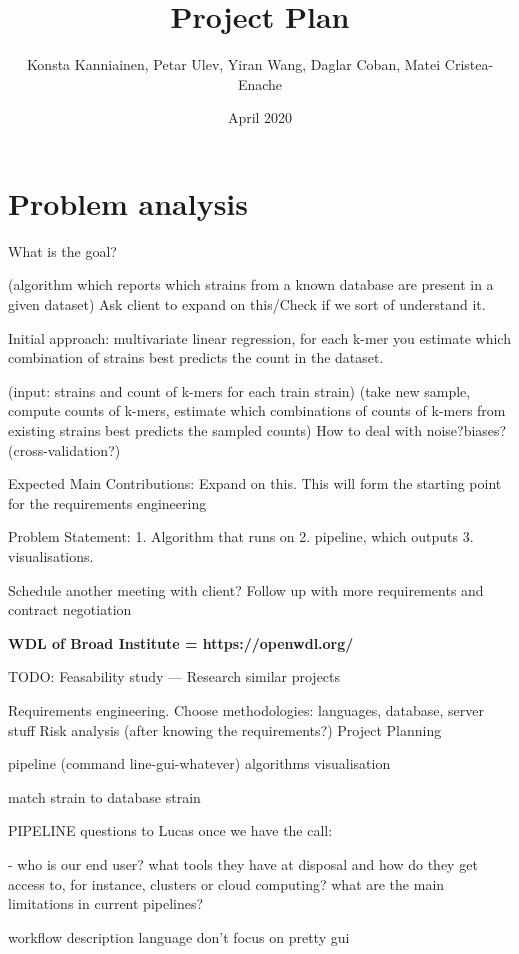 \documentclass{article}
\title{Project Plan}
\author{Konsta Kanniainen, Petar Ulev, Yiran Wang, Daglar Coban, Matei Cristea-Enache}
\date{April 2020}
\begin{document}
\maketitle

\section{Problem analysis}
 
What is the goal? 

(algorithm which reports which strains from a known database are present in a given dataset) Ask client to expand on this/Check if we sort of understand it.

Initial approach: multivariate linear regression, for each k-mer you estimate which combination of strains best predicts the count in the dataset.



(input: strains and count of k-mers for each train strain)
(take new sample, compute counts of k-mers, estimate which combinations of counts of k-mers from existing strains best predicts the sampled counts)
How to deal with noise?biases? (cross-validation?)

Expected Main Contributions: Expand on this.
This will form the starting point for the requirements engineering

Problem Statement:
1. Algorithm that runs on 
2. pipeline, which outputs
3. visualisations.




Schedule another meeting with client? Follow up with more requirements and contract negotiation

\textbf{WDL of Broad Institute = https://openwdl.org/ }


TODO:
Feasability study --- Research similar projects

Requirements engineering. 
Choose methodologies: languages, database, server stuff
Risk analysis (after knowing the requirements?)
Project Planning


pipeline (command line-gui-whatever)
algorithms
visualisation

match strain to database strain


PIPELINE questions to Lucas once we have the call:

- who is our end user? what tools they have at disposal and how do they get access to, for instance, clusters or cloud computing? what are the main limitations in current pipelines? 

workflow description language
don't focus on pretty gui
\end{document}
